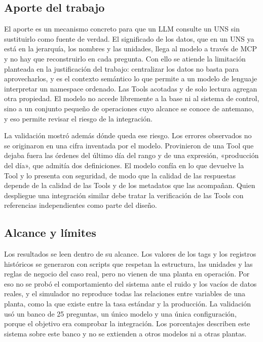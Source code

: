 \subsection{Aporte del trabajo}

El aporte es un mecanismo concreto para que un LLM consulte un UNS sin sustituirlo como fuente de verdad. El significado de los datos, que en un UNS ya está en la jerarquía, los nombres y las unidades, llega al modelo a través de MCP y no hay que reconstruirlo en cada pregunta. Con ello se atiende la limitación planteada en la justificación del trabajo: centralizar los datos no basta para aprovecharlos, y es el contexto semántico lo que permite a un modelo de lenguaje interpretar un namespace ordenado. Las Tools acotadas y de solo lectura agregan otra propiedad. El modelo no accede libremente a la base ni al sistema de control, sino a un conjunto pequeño de operaciones cuyo alcance se conoce de antemano, y eso permite revisar el riesgo de la integración.

La validación mostró además dónde queda ese riesgo. Los errores observados no se originaron en una cifra inventada por el modelo. Provinieron de una Tool que dejaba fuera las órdenes del último día del rango y de una expresión, «producción del día», que admitía dos definiciones. El modelo confía en lo que devuelve la Tool y lo presenta con seguridad, de modo que la calidad de las respuestas depende de la calidad de las Tools y de los metadatos que las acompañan. Quien despliegue una integración similar debe tratar la verificación de las Tools con referencias independientes como parte del diseño.

\subsection{Alcance y límites}

Los resultados se leen dentro de su alcance. Los valores de los tags y los registros históricos se generaron con scripts que respetan la estructura, las unidades y las reglas de negocio del caso real, pero no vienen de una planta en operación. Por eso no se probó el comportamiento del sistema ante el ruido y los vacíos de datos reales, y el simulador no reproduce todas las relaciones entre variables de una planta, como la que existe entre la tasa estándar y la producción. La validación usó un banco de 25 preguntas, un único modelo y una única configuración, porque el objetivo era comprobar la integración. Los porcentajes describen este sistema sobre este banco y no se extienden a otros modelos ni a otras plantas.

